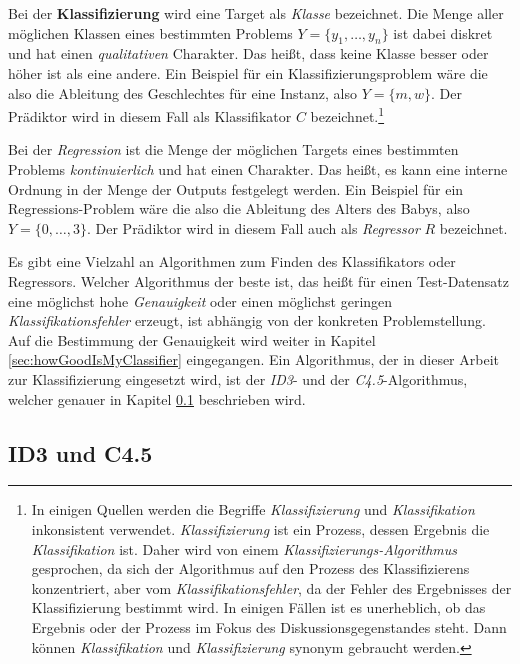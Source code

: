 Bei der \textbf{Klassifizierung} wird eine Target als \emph{Klasse} bezeichnet. Die Menge aller möglichen Klassen eines bestimmten Problems $Y = \{ y_1 , \ldots, y_n\}$ ist dabei diskret und hat einen \emph{qualitativen} Charakter. Das heißt, dass keine Klasse \glqq besser\grqq{} oder \glqq höher\grqq{} ist als eine andere. Ein Beispiel für ein Klassifizierungsproblem wäre die also die Ableitung des Geschlechtes für eine Instanz, also $Y = \{m, w\}$. Der Prädiktor wird in diesem Fall als Klassifikator $C$ bezeichnet.\footnote{In einigen Quellen werden die Begriffe \emph{Klassifizierung} und \emph{Klassifikation} inkonsistent verwendet. \emph{Klassifizierung} ist ein Prozess, dessen Ergebnis die \emph{Klassifikation} ist. Daher wird von einem \emph{Klassifizierungs-Algorithmus} gesprochen, da sich der Algorithmus auf den Prozess des Klassifizierens konzentriert, aber vom \emph{Klassifikationsfehler}, da der Fehler des Ergebnisses der Klassifizierung bestimmt wird. In einigen Fällen ist es unerheblich, ob das Ergebnis oder der Prozess im Fokus des Diskussionsgegenstandes steht. Dann können \emph{Klassifikation} und \emph{Klassifizierung} synonym gebraucht werden. } \cite[S. 28, 127]{statistical_learning}

Bei der \emph{Regression} ist die Menge der möglichen Targets eines bestimmten Problems \emph{kontinuierlich} und hat einen  Charakter. Das heißt, es kann eine interne Ordnung in der Menge der Outputs festgelegt werden. Ein Beispiel für ein Regressions-Problem wäre die also die Ableitung des Alters des Babys, also $Y = \{ 0 , \ldots , 3\}$. Der Prädiktor wird in diesem Fall auch als \emph{Regressor} $R$ bezeichnet.\cite[S. 24]{learning_cart_dobra} \cite[S. 8]{machine_marsland} \cite[S. 28]{statistical_learning}

Es gibt eine Vielzahl an Algorithmen zum Finden des Klassifikators oder Regressors. Welcher Algorithmus der \glqq beste\grqq{} ist, das heißt für einen Test-Datensatz eine möglichst hohe \emph{Genauigkeit} oder einen möglichst geringen \emph{Klassifikationsfehler} erzeugt, ist abhängig von der konkreten Problemstellung. Auf die Bestimmung der Genauigkeit wird weiter in Kapitel \ref{sec:howGoodIsMyClassifier} eingegangen. Ein Algorithmus, der in dieser Arbeit zur Klassifizierung eingesetzt wird, ist der \emph{ID3}- und der \emph{C4.5}-Algorithmus, welcher genauer in Kapitel \ref{sec:id3} beschrieben wird.

\subsection{ID3 und C4.5}
\label{sec:id3}


